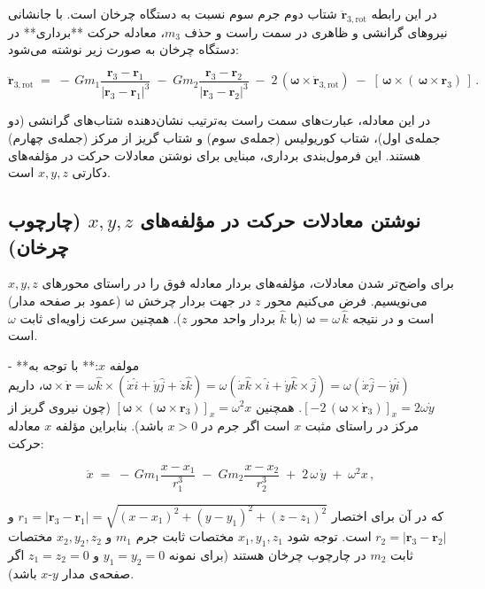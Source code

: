 در این رابطه \(\ddot{\mathbf{r}}_{\!3,\text{rot}}\) شتاب دوم جرم سوم نسبت به دستگاه چرخان است. با جانشانی نیروهای گرانشی و ظاهری در سمت راست و حذف \(m_3\)، معادله حرکت **برداری** در دستگاه چرخان به صورت زیر نوشته می‌شود:

\[ 
\ddot{\mathbf{r}}_{\!3,\text{rot}} \;=\; -\,G m_1 \dfrac{\mathbf{r}_3 - \mathbf{r}_1}{|\mathbf{r}_3 - \mathbf{r}_1|^3}\;-\;G m_2 \dfrac{\mathbf{r}_3 - \mathbf{r}_2}{|\mathbf{r}_3 - \mathbf{r}_2|^3}\;-\;2\,(\boldsymbol{\omega} \times \dot{\mathbf{r}}_{\!3,\text{rot}})\;-\;[\,\boldsymbol{\omega} \times (\,\boldsymbol{\omega} \times \mathbf{r}_3)\,]\,.
\]

در این معادله، عبارت‌های سمت راست به‌ترتیب نشان‌دهنده شتاب‌های گرانشی (دو جمله‌ی اول)، شتاب کوریولیس (جمله‌ی سوم) و شتاب گریز از مرکز (جمله‌ی چهارم) هستند. این فرمول‌بندی برداری، مبنایی برای نوشتن معادلات حرکت در مؤلفه‌های دکارتی \(x, y, z\) است.

\subsection{نوشتن معادلات حرکت در مؤلفه‌های \(x, y, z\) (چارچوب چرخان)}

برای واضح‌تر شدن معادلات، مؤلفه‌های بردار معادله فوق را در راستای محورهای \(x, y, z\) می‌نویسیم. فرض می‌کنیم محور \(z\) در جهت بردار چرخش \(\boldsymbol{\omega}\) (عمود بر صفحه مدار) است و در نتیجه \(\boldsymbol{\omega} = \omega\,\hat{k}\) (با \(\hat{k}\) بردار واحد محور \(z\)). همچنین سرعت زاویه‌ای ثابت \(\omega\) است.

- **مولفه \(x\):** با توجه به \(\boldsymbol{\omega} \times \dot{\mathbf{r}} = \omega \hat{k} \times (\dot{x}\hat{i} + \dot{y}\hat{j} + \dot{z}\hat{k}) = \omega (\dot{x}\hat{k}\times\hat{i} + \dot{y}\hat{k}\times\hat{j}) = \omega (\dot{x}\hat{j} - \dot{y}\hat{i})\)، داریم \([-2\,(\boldsymbol{\omega}\times\dot{\mathbf{r}}_3)]_x = 2\omega\dot{y}\). همچنین \([\boldsymbol{\omega} \times (\boldsymbol{\omega}\times\mathbf{r}_3)]_x = \omega^2 x\) (چون نیروی گریز از مرکز در راستای مثبت \(x\) است اگر جرم در \(x>0\) باشد). بنابراین مؤلفه \(x\) معادله حرکت: 

\[
\ddot{x} \;=\; -\,G m_1 \dfrac{x - x_1}{r_1^3}\;-\;G m_2 \dfrac{x - x_2}{r_2^3}\;+\;2\,\omega\,\dot{y}\;+\;\omega^2 x\,,
\] 

که در آن برای اختصار \(r_1 = |\mathbf{r}_3 - \mathbf{r}_1| = \sqrt{(x-x_1)^2 + (y-y_1)^2 + (z-z_1)^2}\) و \(r_2 = |\mathbf{r}_3 - \mathbf{r}_2|\) است. توجه شود \(x_1, y_1, z_1\) مختصات ثابت جرم \(m_1\) و \(x_2, y_2, z_2\) مختصات ثابت \(m_2\) در چارچوب چرخان هستند (برای نمونه \(y_1=y_2=0\) و \(z_1=z_2=0\) اگر صفحه‌ی مدار \(x\text{-}y\) باشد).

